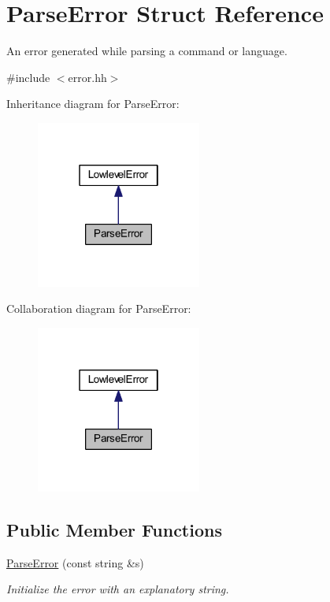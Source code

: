 \hypertarget{struct_parse_error}{}\section{Parse\+Error Struct Reference}
\label{struct_parse_error}


An error generated while parsing a command or language.  




{\ttfamily \#include $<$error.\+hh$>$}



Inheritance diagram for Parse\+Error\+:
\nopagebreak
\begin{figure}[H]
\begin{center}
\leavevmode
\includegraphics[width=154pt]{struct_parse_error__inherit__graph}
\end{center}
\end{figure}


Collaboration diagram for Parse\+Error\+:
\nopagebreak
\begin{figure}[H]
\begin{center}
\leavevmode
\includegraphics[width=154pt]{struct_parse_error__coll__graph}
\end{center}
\end{figure}
\subsection*{Public Member Functions}
\begin{DoxyCompactItemize}
\item 
\mbox{\hyperlink{struct_parse_error_a0daea4d0229631f06ccd34670224ee19}{Parse\+Error}} (const string \&s)
\begin{DoxyCompactList}\small\item\em Initialize the error with an explanatory string. \end{DoxyCompactList}\end{DoxyCompactItemize}
